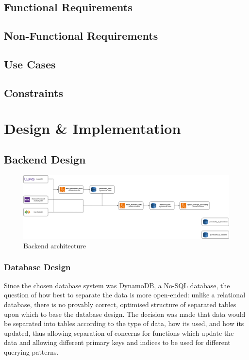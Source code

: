\documentclass[a4paper,11pt]{report}
\begin{document}
\section{Functional Requirements}
\section{Non-Functional Requirements}
\section{Use Cases}
\section{Constraints}

\chapter{Design \& Implementation}
\section{Backend Design}
\begin{figure}[H]
    \centering
    \includegraphics[width=\textwidth]{./images/diagram_all.png}
    \caption{Backend architecture}
\end{figure}

\subsection{Database Design}
Since the chosen database system was DynamoDB, a No-SQL database, the question of how best to separate the data is more open-ended: unlike a relational database, there is no provably correct, optimised structure of separated tables upon which to base the database design.
The decision was made that data would be separated into tables according to the type of data, how its used, and how its updated, thus allowing separation of concerns for functions which update the data and allowing different primary keys and indices to be used for different querying patterns.
\end{document}
